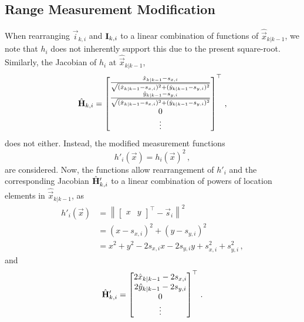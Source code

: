 \subsection{Range Measurement Modification}\label{subsec:nonlin_fusion:measurement_modification}
When rearranging $\vec{i}_{k, i}$ and ${{\mathbf{I}}}_{k, i}$ to a linear combination of functions of $\hat{\vec{x}}_{k|k-1}$, we note that $h_i$ does not inherently support this due to the present square-root. Similarly, the Jacobian of $h_i$ at $\hat{\vec{x}}_{k|k-1}$,
\begin{equation}
    \hat{{{\mathbf{H}}}}_{k,i} = 
    \begin{bmatrix}
        \frac{\hat{x}_{k|k-1} - s_{x,i}}{\sqrt{(\hat{x}_{k|k-1} - s_{x,i})^2 + (\hat{y}_{k|k-1} - s_{y,i})^2}} \\
        \frac{\hat{y}_{k|k-1} - s_{y,i}}{\sqrt{(\hat{x}_{k|k-1} - s_{x,i})^2 + (\hat{y}_{k|k-1} - s_{y,i})^2}} \\
        0 \\
        \vdots
    \end{bmatrix}^\top\,,
\end{equation}
does not either. Instead, the modified measurement functions
\begin{equation}\label{eq:nonlin_fusion:modified_measurement_func}
    h'_i(\vec{x}) = h_i(\vec{x})^2\,,
\end{equation}
are considered. Now, the functions allow rearrangement of $h'_i$ and the corresponding Jacobian $\hat{{{\mathbf{H}}}}'_{k,i}$ to a linear combination of powers of location elements in $\hat{\vec{x}}_{k|k-1}$, as
\begin{equation}
    \begin{split}
        h'_i(\vec{x}) &= \left\lVert
        \begin{bmatrix}
            x & y
        \end{bmatrix}^\top - \vec{s}_i\right\rVert^2 \\
        &= (x - s_{x,i})^2 + (y - s_{y,i})^2 \\
        &= x^2 + y^2 -2s_{x,i}x -2s_{y,i}y +s_{x,i}^2 +s_{y,i}^2\,,
    \end{split}
\end{equation}
and
\begin{equation}\label{eq:nonlin_fusion:modified_jacobian}
    \hat{{{\mathbf{H}}}}'_{k,i} = 
    \begin{bmatrix}
        2\hat{x}_{k|k-1} - 2s_{x,i} \\
        2\hat{y}_{k|k-1} - 2s_{y,i} \\
        0 \\
        \vdots
    \end{bmatrix}^\top\,.
\end{equation}
